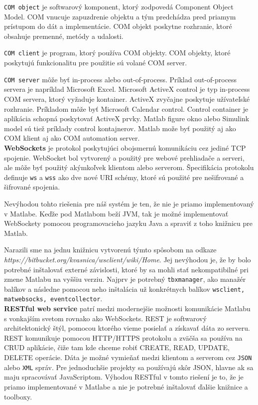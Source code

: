 \verb|COM object| je softwarový komponent, ktorý zodpovedá Component Object Model. COM vnucuje zapuzdrenie objektu a tým predchádza pred priamym prístupom do dát a implementácie. COM objekt poskytne rozhranie, ktoré obsahuje premenné, metódy a udalosti.

\verb|COM client| je program, ktorý používa COM objekty. COM objekty, ktoré poskytujú funkcionalitu pre použitie sú volané COM server.

\verb|COM server| môže byť in-process alebo out-of-process. Príklad out-of-process servera je napríklad Microsoft Excel. Microsoft ActiveX control je typ in-process COM servera, ktorý vyžaduje kontainer. ActiveX zvyčajne poskytuje užívateľské rozhranie. Príkladom môže byť Microsoft Calendar control. Control container je aplikácia schopná poskytovať ActiveX prvky. Matlab figure okno alebo Simulink model sú tiež príklady control kontajnerov. Matlab može byť použitý aj ako COM klient aj ako COM automation server.\cite{matlab-com}\\

\textbf{WebSockets} je protokol poskytujúci obojsmernú komunikáciu cez jediné TCP spojenie. WebSocket bol vytvorený a použitý pre webové prehliadače a serveri, ale môže byť použitý akýmkoľvek klientom alebo serverom. Špecifikácia protokolu definuje \verb|ws| a \verb|wss| ako dve nové URI schémy, ktoré sú použité pre nešifrované a šifrované spojenia.

Nevýhodou tohto riešenia pre náš systém je ten, že nie je priamo implementovaný v Matlabe. Keďže pod Matlabom beží JVM, tak je možné implementovať WebSockety pomocou programovacieho jazyku Java a spraviť z toho knižnicu pre Matlab.

Narazili sme na jednu knižnicu vytvorenú týmto spôsobom na odkaze\\ \textit{https://bitbucket.org/kvasnica/wsclient/wiki/Home}. Jej nevýhodou je, že by bolo potrebné inštalovať externé závislosti, ktoré by sa mohli stať nekompatibilné pri zmene Matlabu na vyššiu verziu. Najprv je potrebný \verb|tbxmanager|, ako manažér balíkov a následne pomocou neho inštalácia už konkrétnych balíkov \verb|wsclient, matwebsocks, eventcollector|.\\

\textbf{RESTful web service} patrí medzi modernejšie možnosti komunikácie Matlabu s vonkajším svetom rovnako ako WebSockets. REST je softwarový architektonický štýl, pomocou ktorého vieme posielať a získavať dáta zo serveru. REST komunikuje pomocou HTTP/HTTPS protokolu a zväčša sa používa na CRUD aplikácie, čiže tam kde chceme robiť CREATE, READ, UPDATE, DELETE operácie. Dáta je možné vymieňať medzi klientom a serverom cez \verb|JSON| alebo \verb|XML| správ. Pre jednoduchšie projekty sa používajú skôr JSON, hlavne ak sa maju spracovávať JavaScriptom. Výhodou RESTful v tomto riešení je to, že je priamo implementované v Matlabe a nie je potrebné inštalovať ďalšie knižnice a toolboxy.

